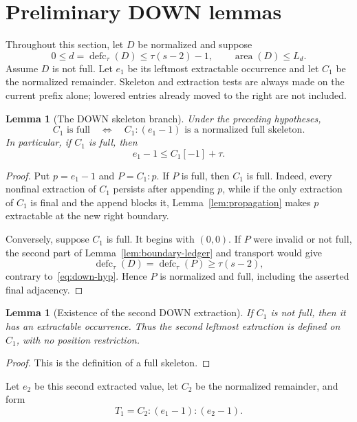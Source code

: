 \documentclass[11pt]{article}
\newtheorem{lemma}[theorem]{Lemma}
\theoremstyle{definition}
\theoremstyle{remark}
\newcommand{\area}{\operatorname{area}}
\newcommand{\defc}{\operatorname{defc}}
\begin{document}
\section{Preliminary DOWN lemmas}

Throughout this section, let $D$ be normalized and suppose
\begin{equation}
  0\le d=\defc_\tau(D)\le\tau(s-2)-1,
  \qquad \area(D)\le L_d.
  \label{eq:down-hyp}
\end{equation}
Assume $D$ is not full.  Let $e_1$ be its leftmost
extractable occurrence and let $C_1$ be the normalized remainder.  Skeleton
and extraction tests are always made on the current prefix alone; lowered
entries already moved to the right are not included.

\begin{lemma}[The DOWN skeleton branch]
\label{lem:down-skeleton}
Under the preceding hypotheses,
\[
  C_1\text{ is full}
  \quad\Longleftrightarrow\quad
  C_1:(e_1-1)\text{ is a normalized full skeleton}.
\]
In particular, if $C_1$ is full, then
\[
  e_1-1\le C_1[-1]+\tau.
\]
\end{lemma}

\begin{proof}
Put $p=e_1-1$ and $P=C_1:p$.  If $P$ is full, then $C_1$ is full.  Indeed,
every nonfinal extraction of $C_1$ persists after appending $p$, while if
the only extraction of $C_1$ is final and the append blocks it,
Lemma~\ref{lem:propagation} makes $p$ extractable at the new right boundary.

Conversely, suppose $C_1$ is full.  It begins with $(0,0)$.  If $P$ were
invalid or not full, the second part of Lemma~\ref{lem:boundary-ledger} and
transport would give
\[
  \defc_\tau(D)=\defc_\tau(P)\ge\tau(s-2),
\]
contrary to~\eqref{eq:down-hyp}.  Hence $P$ is normalized and full, including
the asserted final adjacency.
\end{proof}

\begin{lemma}[Existence of the second DOWN extraction]
\label{lem:down-second}
If $C_1$ is not full, then it has an extractable occurrence.  Thus the second
leftmost extraction is defined on $C_1$, with no position restriction.
\end{lemma}

\begin{proof}
This is the definition of a full skeleton.
\end{proof}

Let $e_2$ be this second extracted value, let $C_2$ be the normalized
remainder, and form
\[
  T_1=C_2:(e_1-1):(e_2-1).
\]
\end{document}
